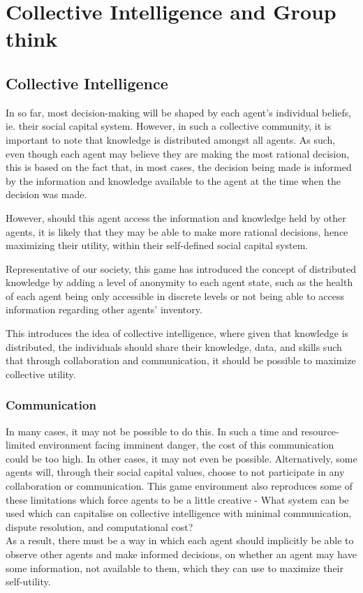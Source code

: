 \section{Collective Intelligence and Group think}
\subsection{Collective Intelligence}
In so far, most decision-making will be shaped by each agent's individual beliefs, ie. their social capital system. However, in such a collective community, it is important to note that knowledge is distributed amongst all agents. As such, even though each agent may believe they are making the most rational decision, this is based on the fact that, in most cases, the decision being made is informed by the information and knowledge available to the agent at the time when the decision was made.

However, should this agent access the information and knowledge held by other agents, it is likely that they may be able to make more rational decisions, hence maximizing their utility, within their self-defined social capital system.

Representative of our society, this game has introduced the concept of distributed knowledge by adding a level of anonymity to each agent state, such as the health of each agent being only accessible in discrete levels or not being able to access information regarding other agents' inventory.

This introduces the idea of collective intelligence, where given that knowledge is distributed, the  individuals should share their knowledge, data, and skills such that through collaboration and communication, it should be possible to maximize collective utility.\\

\subsubsection{Communication}
In many cases, it may not be possible to do this. In such a time and resource-limited environment facing imminent danger, the cost of this communication could be too high. In other cases, it may not even be possible. Alternatively, some agents will, through their social capital values, choose to not participate in any collaboration or communication. This game environment also reproduces some of these limitations which force agents to be a little creative - What system can be used which can capitalise on collective intelligence with minimal communication, dispute resolution, and computational cost? \\
As a result, there must be a way in which each agent should implicitly be able to observe other agents and make informed decisions, on whether an agent may have some information, not available to them, which they can use to maximize their self-utility.

